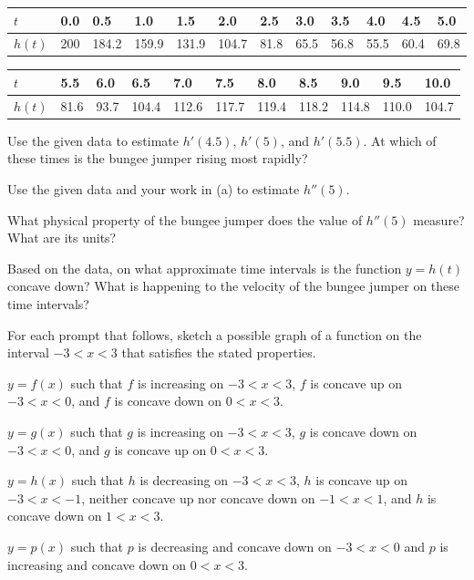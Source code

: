 \begin{exercises}
\begin{tabular}{ l | l | l | l |  l | l | l | l | l | l | l | l }
$t$ & 0.0 & 0.5 & 1.0 & 1.5 & 2.0 & 2.5 & 3.0 & 3.5 & 4.0 & 4.5 & 5.0    \\ \hline %
\smallskip
$h(t)$ & 200 & 184.2 &  159.9 &  131.9 &  104.7 & 81.8 &  65.5 &  56.8 &  55.5 & 60.4 & 69.8 
\\ %
\end{tabular}

\begin{tabular}{ l | l | l | l |  l | l | l | l | l | l | l  }
$t$ & 5.5 & 6.0 & 6.5 & 7.0 & 7.5 & 8.0 & 8.5 & 9.0 & 9.5 & 10.0 \\ \hline %
$h(t)$ & 81.6 & 93.7 &  104.4 &  112.6 &  117.7 & 119.4 & 118.2 & 114.8 &  110.0 &  104.7
\\ %
\end{tabular}

\ba
	\item Use the given data to estimate $h'(4.5)$, $h'(5)$, and $h'(5.5)$.  At which of these times is the bungee jumper rising most rapidly?
	\item Use the given data and your work in (a) to estimate $h''(5)$.
	\item What physical property of the bungee jumper does the value of $h''(5)$ measure?  What are its units?
	\item Based on the data, on what approximate time intervals is the function $y = h(t)$ concave down?  What is happening to the velocity of the bungee jumper on these time intervals?
\ea

\item For each prompt that follows, sketch a possible graph of a function on the interval $-3 < x < 3$ that satisfies the stated properties.
\ba
	\item $y = f(x)$ such that $f$ is increasing on $-3 < x < 3$, $f$ is concave up on $-3 < x < 0$, and $f$ is concave down on $0 < x < 3$.
	\item $y = g(x)$ such that $g$ is increasing on $-3 < x < 3$, $g$ is concave down on $-3 < x < 0$, and $g$ is concave up on $0 < x < 3$.
	\item $y = h(x)$ such that $h$ is decreasing on $-3 < x < 3$, $h$ is concave up on $-3 < x < -1$, neither concave up nor concave down on $-1 < x < 1$, and $h$ is concave down on $1 < x < 3$.
	\item $y = p(x)$ such that $p$ is decreasing and concave down on $-3 < x < 0$ and $p$ is increasing and concave down on $0 < x < 3$.
\ea

\end{exercises}
\afterexercises